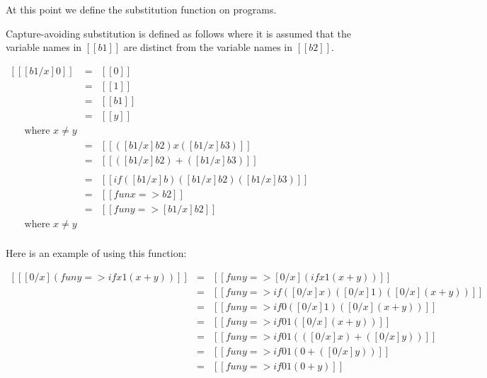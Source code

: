 \documentclass{article}
\begin{document}
At this point we define the substitution function on programs.
\begin{definition}
  \label{def:substitution}
  Capture-avoiding substitution is defined as follows where it is
  assumed that the variable names in $[[b1]]$ are distinct from the
  variable names in $[[b2]]$.
  \begin{center}
    \begin{math}
      \begin{array}{lll}
        [[ [b1/x]0]] & = & [[0]]\\
        [[ [b1/x]1]] & = & [[1]]\\
        [[ [b1/x]x]] & = & [[b1]]\\
        [[ [b1/x]y]] & = & [[y]]\\
        \,\,\,\,\,\,\,\text{ where } x \neq y\\
        [[ [b1/x](b2 x b3)]] & = & [[([b1/x]b2) x ([b1/x]b3)]]\\
        [[ [b1/x](b2 + b3)]] & = & [[([b1/x]b2) + ([b1/x]b3)]]\\\\
        [[ [b1/x](if b b2 b3)]] & = & [[if ([b1/x]b) ([b1/x]b2) ([b1/x]b3)]]\\
        [[ [b1/x](fun x => b2)]] & = & [[fun x => b2]]\\
        [[ [b1/x](fun y => b2)]] & = & [[fun y => [b1/x]b2]]\\
        \,\,\,\,\,\,\,\text{ where } x \neq y\\        
      \end{array}
    \end{math}
  \end{center}
\end{definition}
Here is an example of using this function:
\begin{center}
  \begin{math}
    \begin{array}{lll}
      [[ [0/x](fun y => if x 1 (x + y))]]
      & = &
      [[ fun y => [0/x](if x 1 (x + y))]]\\
      & = &
      [[ fun y => if ([0/x]x) ([0/x]1) ([0/x](x + y))]]\\
      & = &
      [[ fun y => if 0 ([0/x]1) ([0/x](x + y))]]\\
      & = &
      [[ fun y => if 0 1 ([0/x](x + y))]]\\
      & = &
      [[ fun y => if 0 1 (([0/x]x) + ([0/x]y))]]\\
      & = &
      [[ fun y => if 0 1 (0 + ([0/x]y))]]\\
      & = &
      [[ fun y => if 0 1 (0 + y)]]\\   
    \end{array}
  \end{math}
\end{center}
\end{document}
